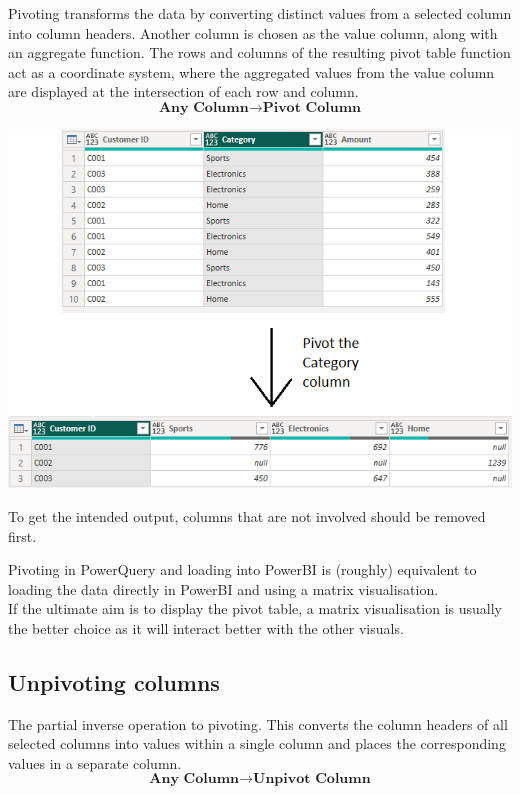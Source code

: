 \documentclass[10pt, openany, twocolumn]{book}
\begin{document}
Pivoting transforms the data by converting distinct values from a selected column into column headers. Another column is chosen as the value column, along with an aggregate function. The rows and columns of the resulting pivot table function act as a coordinate system, where the aggregated values from the value column are displayed at the intersection of each row and column.
$$\textbf{Any Column} \rightarrow \textbf{Pivot Column}$$
\begin{center}
    \includegraphics[width = 0.95\columnwidth]{images/pivot.png}
\end{center}
\begin{tcolorbox}[colback=yellow!2!white, colframe=yellow!60!gray]
To get the intended output, columns that are not involved should be removed first.
\end{tcolorbox}
\begin{tcolorbox}[colback=yellow!2!white, colframe=yellow!60!gray]
Pivoting in PowerQuery and loading into PowerBI is (roughly) equivalent to loading the data directly in PowerBI and using a matrix visualisation. \\

If the ultimate aim is to display the pivot table, a matrix visualisation is usually the better choice as it will interact better with the other visuals.
\end{tcolorbox}

\subsection*{Unpivoting columns}

The partial inverse operation to pivoting. This converts the column headers of all selected columns into values within a single column and places the corresponding values in a separate column.
$$\textbf{Any Column} \rightarrow \textbf{Unpivot Column}$$
\end{document}
